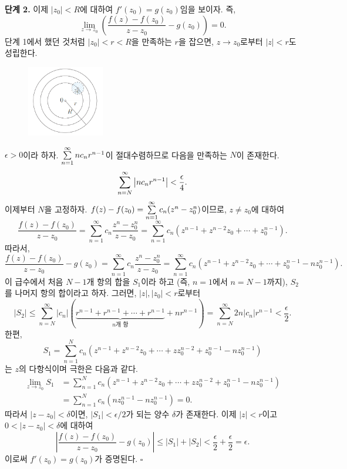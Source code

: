 {\bf 단계 2.}
이제 $|z_0|<R$에 대하여 $f'(z_0) = g(z_0)$임을 보이자. 즉,
\[
\lim_{z\to z_0} \left(
\dfrac{f(z)-f(z_0)}{z-z_0} - g(z_0) \right) = 0.
\]
단계 1에서 했던 것처럼 $|z_0|<r<R$을 만족하는 $r$을 잡으면, 
$z\to z_0$로부터 $|z|<r$도 성립한다.

\begin{figure}[h!]
\begin{center}
\includegraphics[width=0.3\textwidth]{./SaltChapter/fig-4-0-3}
\end{center}
\end{figure}

$\epsilon>0$이라 하자.
$\sum\limits_{n=1}^\infty nc_nr^{n-1}$이 절대수렴하므로
다음을 만족하는 $N$이 존재한다.
\[
\sum\limits_{n=N}^\infty \left| nc_nr^{n-1}\right| < \displaystyle\frac \epsilon4.
\]
이제부터 $N$을 고정하자.
$f(z) - f(z_0) = \sum\limits_{n=1}^\infty c_n(z^n - z_0^n)$이므로,
$z\ne z_0$에 대하여
\[
\dfrac{f(z)-f(z_0)}{z-z_0}  
= \sum_{n=1}^\infty c_n \dfrac{z^n-z_0^n}{z-z_0}
= \sum_{n=1}^\infty c_n \left(
z^{n-1} + z^{n-2}z_0 + \cdots + z_0^{n-1} \right).
\]
따라서,
\[
\dfrac{f(z)-f(z_0)}{z-z_0}   - g(z_0)
= \sum_{n=1}^\infty c_n \dfrac{z^n-z_0^n}{z-z_0}
= \sum_{n=1}^\infty c_n \left(
z^{n-1} + z^{n-2}z_0 + \cdots + z_0^{n-1} - nz_0^{n-1}\right).
\]
이 급수에서 처음 $N-1$개 항의 합을 $S_1$이라 하고
(즉, $n=1$에서 $n=N-1$까지),
$S_2$를 나머지 항의 합이라고 하자.
그러면, $|z|, |z_0| < r$로부터
\[
|S_2| \le \sum_{n=N}^\infty |c_n| 
\left( \underbrace{r^{n-1}+r^{n-1} + \cdots + r^{n-1}}_{n\text{개 항}}
+ nr^{n-1}\right)
= \sum_{n=N}^\infty 2n|c_n|r^{n-1} < \dfrac\epsilon2.
\]
한편,
\[
S_1= \sum_{n=1}^N c_n \left(
z^{n-1} + z^{n-2}z_0 + \cdots + zz_0^{n-2} + z_0^{n-1} - nz_0^{n-1}
\right)
\]
는 $z$의 다항식이며 극한은 다음과 같다.
\begin{align*}
\lim_{z\to z_0} S_1
&= \sum_{n=1}^N c_n \left(
z^{n-1} + z^{n-2}z_0 + \cdots + zz_0^{n-2} + z_0^{n-1} - nz_0^{n-1}
\right) \\
&= \sum_{n=1}^N c_n \left(
nz_0^{n-1}  - nz_0^{n-1} \right) = 0.
\end{align*}
따라서
$|z-z_0|<\delta$이면, $|S_1|< \epsilon/2$가 되는 
양수 $\delta$가 존재한다.
이제 $|z|<r$이고 $0<|z-z_0|< \delta$에 대하여
\[
\left| \dfrac{f(z)-f(z_0)}{z-z_0}   - g(z_0) \right|
\le |S_1| + |S_2| <  \dfrac\epsilon2 + \dfrac\epsilon2 = \epsilon.
\]
이로써 $f'(z_0) = g(z_0)$가 증명된다.
\hfill $\square$

